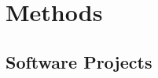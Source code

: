 \documentclass[12pt, a4paper]{report}
\begin{document}
\chapter{Methods} \label{sec:Methods}







\printbibliography{}

\begin{appendices}
  \chapter{Software Projects}
  
\end{appendices}
\end{document}
